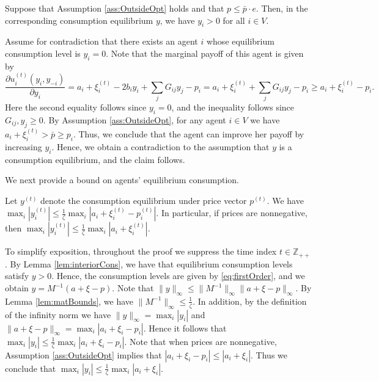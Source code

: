 \documentclass[opre,nonblindrev]{informs3} %
\begin{document}
\begin{APPENDIX}{}
 		\begin{lemma} \label{lem:interiorCons}
 		Suppose that Assumption \ref{ass:OutsideOpt} holds and that ${p} \leq \bar{p} \cdot {e}$.
 		Then, in the corresponding consumption equilibrium ${y}$,
 		we have $y_i>0$ for all $i\in V$.
 	\end{lemma}
 	\noindent{}
 	Assume for contradiction that there exists an agent $i$ whose equilibrium consumption level is $y_i=0$. Note that the marginal payoff of this agent is given by
 	\[\frac{\partial u_i^{(t)}(y_i,y_{-i})}{\partial y_i}= a_i+\xi_i^{(t)}- 2b_i y_i + \sum_j G_{ij} y_j -p_i=a_i+\xi_i^{(t)}+ \sum_j G_{ij}y_j -p_i \geq a_i+\xi_i^{(t)}-p_i.\]
 	Here the second equality follows since $y_i=0$, and the inequality follows since $G_{ij},y_j \geq 0$.
 	By Assumption \ref{ass:OutsideOpt},
 	for any agent $i\in V$ we have  $a_i+\xi_i^{(t)}>\bar p \geq p_i$. Thus, we conclude that the agent can improve her payoff by increasing $y_i$.
 	Hence, we obtain a contradiction to the assumption that ${y}$ is a consumption equilibrium, and the claim follows. \hfill \Halmos	
 	\endproof
 	
 	
 	We next provide a bound on agents' equilibrium consumption.
 	\begin{lemma} \label{lem:boundedConsumption}
 		Let ${y}^{(t)}$ denote the consumption equilibrium under price vector ${p}^{(t)}$.
 		We have $\max_i |y^{(t)}_i|\leq \frac{1}{\zeta} \max_i |a_i+\xi_i^{(t)}-p^{(t)}_i|$. In particular, if prices are nonnegative, then $\max_i |y^{(t)}_i|\leq  \frac{1}{\zeta} \max_i |a_i+\xi_i^{(t)}|$.
 	\end{lemma}	
 	To simplify exposition, throughout the proof we suppress the time index $t\in \mathbb{Z}_{++}$.
 	By Lemma \ref{lem:interiorCons},
 	we have that equilibrium consumption levels satisfy ${y}>0$. Hence, the consumption levels are given by \eqref{eq:firstOrder}, and we obtain ${y} = M^{-1} ({a}+{\xi}-{p})$.
 	Note that $\|{y}\|_\infty \leq \| M^{-1}\|_\infty \| {a}+{\xi} -{p}\|_\infty$.
 	By Lemma \ref{lem:matBounds}, we have $\| M^{-1}\|_\infty \leq \frac{1}{\zeta}$. In addition, by the definition of the infinity norm we have
 	$\|{y}\|_\infty=\max_i |y_i|$  and $ \| {a}+{\xi}-{p}\|_\infty = \max_i |a_i+{\xi}_i-p_i|$. Hence it follows that
 	$\max_i |y_i|\leq \frac{1}{\zeta} \max_i |a_i+\xi_i-p_i|$. Note that when prices are nonnegative, Assumption \ref{ass:OutsideOpt} implies that
 	$|a_i+\xi_i-p_i|\leq |a_i+\xi_i|$. Thus we conclude that $\max_i |y_i|\leq  \frac{1}{\zeta} \max_i |a_i+\xi_i|$.
 	\hfill \halmos
 	\endproof
 	

\end{APPENDIX}
\end{document}
